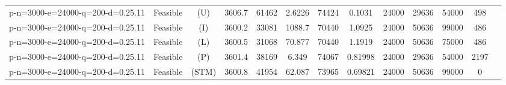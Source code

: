 \documentclass[landscape, a4paper]{article}
\newcommand{\STM}{\ensuremath{\mathrm{STM}}}
\newcommand{\Improved}{\ensuremath{\mathrm{I}}}
\newcommand{\Loose}{\ensuremath{\mathrm{L}}}
\newcommand{\Profit}{\ensuremath{\mathrm{P}}}
\newcommand{\Utility}{\ensuremath{\mathrm{U}}}
\begin{document}
\begin{center}
\begin{tabular}{lcccccccccccc}
p-n=3000-e=24000-q=200-d=0.25.11 & Feasible & (\Utility) & 3606.7 & 61462 & 2.6226 & 74424 & 0.1031 & 24000 & 29636 & 54000 & 498 & \\
p-n=3000-e=24000-q=200-d=0.25.11 & Feasible & (\Improved) & 3600.2 & 33081 & 1088.7 & 70440 & 1.0925 & 24000 & 50636 & 99000 & 486 & \\
p-n=3000-e=24000-q=200-d=0.25.11 & Feasible & (\Loose) & 3600.5 & 31068 & 70.877 & 70440 & 1.1919 & 24000 & 50636 & 75000 & 486 & \\
p-n=3000-e=24000-q=200-d=0.25.11 & Feasible & (\Profit) & 3601.4 & 38169 & 6.349 & 74067 & 0.81998 & 24000 & 29636 & 54000 & 2197 & \\
p-n=3000-e=24000-q=200-d=0.25.11 & Feasible & (\STM) & 3600.8 & 41954 & 62.087 & 73965 & 0.69821 & 24000 & 50636 & 99000 & 0 & \\
\end{tabular}
\end{center}
\end{document}
